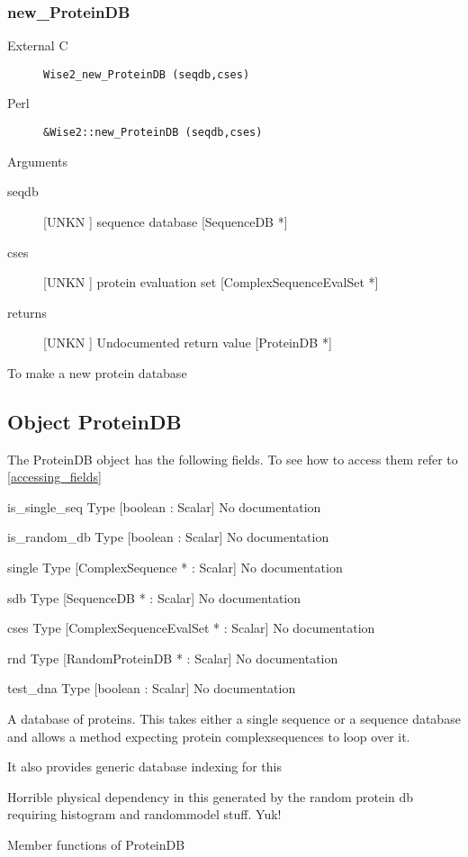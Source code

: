 \subsubsection{new_ProteinDB}
\begin{description}
\item[External C] {\tt Wise2_new_ProteinDB (seqdb,cses)}
\item[Perl] {\tt &Wise2::new_ProteinDB (seqdb,cses)}

\end{description}
Arguments
\begin{description}
\item[seqdb] [UNKN ] sequence database [SequenceDB *]
\item[cses] [UNKN ] protein evaluation set [ComplexSequenceEvalSet *]
\item[returns] [UNKN ] Undocumented return value [ProteinDB *]
\end{description}
To make a new protein database




\subsection{Object ProteinDB}

\label{object_ProteinDB}

The ProteinDB object has the following fields. To see how to access them refer to \ref{accessing_fields}
\begin{description}
\item{is_single_seq} Type [boolean : Scalar] No documentation

\item{is_random_db} Type [boolean : Scalar] No documentation

\item{single} Type [ComplexSequence * : Scalar] No documentation

\item{sdb} Type [SequenceDB * : Scalar] No documentation

\item{cses} Type [ComplexSequenceEvalSet * : Scalar] No documentation

\item{rnd} Type [RandomProteinDB * : Scalar] No documentation

\item{test_dna} Type [boolean : Scalar] No documentation

\end{description}
A database of proteins. This takes
either a single sequence or a 
sequence database and allows a
method expecting protein complexsequences
to loop over it.


It also provides generic database indexing
for this




Horrible physical dependency in this
generated by the random protein db
requiring histogram and randommodel
stuff. Yuk!




Member functions of ProteinDB

